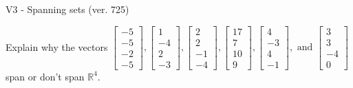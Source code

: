 \begin{exercise}
  \begin{exerciseTitle}V3 - Spanning sets (ver. 725)\end{exerciseTitle}
  \begin{exerciseStatement}
    Explain why the vectors \(\left[\begin{array}{r}
-5 \\
-5 \\
-2 \\
-5
\end{array}\right] , \left[\begin{array}{r}
1 \\
-4 \\
2 \\
-3
\end{array}\right] , \left[\begin{array}{r}
2 \\
2 \\
-1 \\
-4
\end{array}\right] , \left[\begin{array}{r}
17 \\
7 \\
10 \\
9
\end{array}\right] , \left[\begin{array}{r}
4 \\
-3 \\
4 \\
-1
\end{array}\right] , \text{ and } \left[\begin{array}{r}
3 \\
3 \\
-4 \\
0
\end{array}\right]\) span or don't span \(\mathbb{R}^4\). 
	



\end{exerciseStatement}
\end{exercise}
